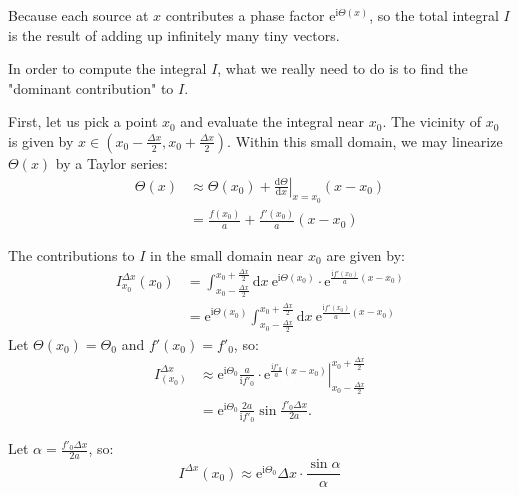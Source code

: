 Because each source at $x$ contributes a phase factor $\mathrm{e}^{\mathrm{i}\Theta(x)}$, 
so the total integral $I$ is the result of adding up infinitely many tiny vectors.

In order to compute the integral $I$, 
what we really need to do is to find the "dominant contribution" to $I$.

First, let us pick a point $x_0$ and evaluate the integral near $x_0$.
The vicinity of $x_0$ is given by $x \in (x_0-\frac{\Delta x}{2}, x_0+\frac{\Delta x}{2})$. 
Within this small domain, we may linearize $\Theta(x)$ by a Taylor series:
\begin{equation}
\begin{aligned}
\Theta(x) &\approx \Theta(x_0) + \left.\frac{\mathrm{d}\Theta}{\mathrm{d}x}\right|_{x=x_0} (x-x_0) \\
&= \frac{f(x_0)}{a} + \frac{f'(x_0)}{a} (x-x_0)
\end{aligned}
\end{equation}

The contributions to $I$ in the small domain near $x_0$ are given by:
\begin{equation}
\begin{aligned}
I_{x_0}^{\Delta x}(x_0) &= \int_{x_0-\frac{\Delta x}{2}}^{x_0+\frac{\Delta x}{2}} \mathrm{d}x \ \mathrm{e}^{\mathrm{i}\Theta(x_0)} \cdot \mathrm{e}^{\frac{\mathrm{i}f'(x_0)}{a} (x-x_0)} \\
&= \mathrm{e}^{\mathrm{i}\Theta(x_0)} \int_{x_0-\frac{\Delta x}{2}}^{x_0+\frac{\Delta x}{2}} \mathrm{d}x \ \mathrm{e}^{\frac{\mathrm{i}f'(x_0)}{a} (x-x_0)}
\end{aligned}
\end{equation}
Let $\Theta(x_0)=\Theta_0$ and $f'(x_0)=f'_0$, so:
\begin{equation}
\begin{aligned}
I_{(x_0)}^{\Delta x} &\approx \mathrm{e}^{\mathrm{i}\Theta_0} \frac{a}{\mathrm{i}f'_0} \cdot \left. \mathrm{e}^{\frac{\mathrm{i}f'_0}{a}(x-x_0)} \right|_{x_0-\frac{\Delta x}{2}}^{x_0+\frac{\Delta x}{2}} \\
&= \mathrm{e}^{\mathrm{i}\Theta_0} \frac{2a}{\mathrm{i}f'_0} \sin \frac{f'_0 \Delta x}{2a}.
\end{aligned}
\end{equation}

Let $\alpha = \frac{f'_0 \Delta x}{2a}$, so:
\begin{equation}
I^{\Delta x}(x_0) \approx \mathrm{e}^{\mathrm{i}\Theta_0} \Delta x \cdot \frac{\sin \alpha}{\alpha}
\end{equation}

